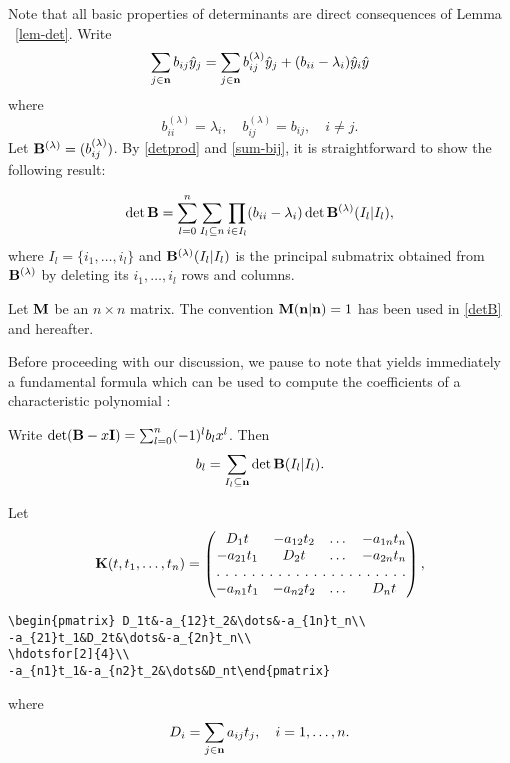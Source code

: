 Note that all basic properties of determinants are direct consequences
of Lemma ~\ref{lem-det}. Write
\begin{equation}\label{sum-bij}
\sum_{j\in\bold n}b_{ij}\hat y_j=\sum_{j\in\bold n}b^{(\lambda)}
_{ij}\hat y_j+(b_{ii}-\lambda_i)\hat y_i\hat y
\end{equation}
where
\begin{equation}
b^{(\lambda)}_{ii}=\lambda_i,\quad b^{(\lambda)}_{ij}=b_{ij},
\quad i\not=j.
\end{equation}
Let $\bold B^{(\lambda)}=(b^{(\lambda)}_{ij})$. By \eqref{detprod}
and \eqref{sum-bij}, it is
straightforward to show the following
result:
\begin{thm}\label{thm-main}
\begin{equation}\label{detB}
\det\bold B=
\sum^n_{l =0}\sum_{I_l \subseteq n}
\prod_{i\in I_l}(b_{ii}-\lambda_i)
\det\bold B^{(\lambda)}(I_l |I_l ),
\end{equation}
where $I_l =\{i_1,\dots,i_l \}$ and $\bold B^{(\lambda)}(I_l |I_l )$
is the principal submatrix obtained from $\bold B^{(\lambda)}$
by deleting its $i_1,\dots,i_l $ rows and columns.
\end{thm}

\begin{rem}
Let $\bold M$ be an $n\times n$ matrix. The convention
$\bold M(\bold n|\bold n)=1$ has been used in \eqref{detB} and hereafter.
\end{rem}

Before proceeding with our discussion, we pause to note that
 yields immediately a fundamental formula which can be
used to compute the coefficients of a characteristic polynomial
\cite{mami:matrixth}:
{\samepage
\begin{cor}\label{BI}
Write $\det(\bold B-x\bold I)=\sum^n_{l =0}(-1)
^l b_l x^l $. Then
\begin{equation}\label{bl-sum}
b_l =\sum_{I_l \subseteq\bold n}\det\bold B(I_l |I_l ).
\end{equation}
\end{cor}
}
Let
\begin{equation}
\bold K(t,t_1,\dots,t_n)=\begin{pmatrix} D_1t&-a_{12}t_2&\dots&-a_{1n}t_n\\
-a_{21}t_1&D_2t&\dots&-a_{2n}t_n\\
\hdotsfor[2]{4}\\
-a_{n1}t_1&-a_{n2}t_2&\dots&D_nt\end{pmatrix},
\end{equation}
%
%
\begin{verbatim}
\begin{pmatrix} D_1t&-a_{12}t_2&\dots&-a_{1n}t_n\\
-a_{21}t_1&D_2t&\dots&-a_{2n}t_n\\
\hdotsfor[2]{4}\\
-a_{n1}t_1&-a_{n2}t_2&\dots&D_nt\end{pmatrix}
\end{verbatim}
where
\begin{equation}
D_i=\sum_{j\in\bold n}a_{ij}t_j,\quad i=1,\dots,n.
\end{equation}

